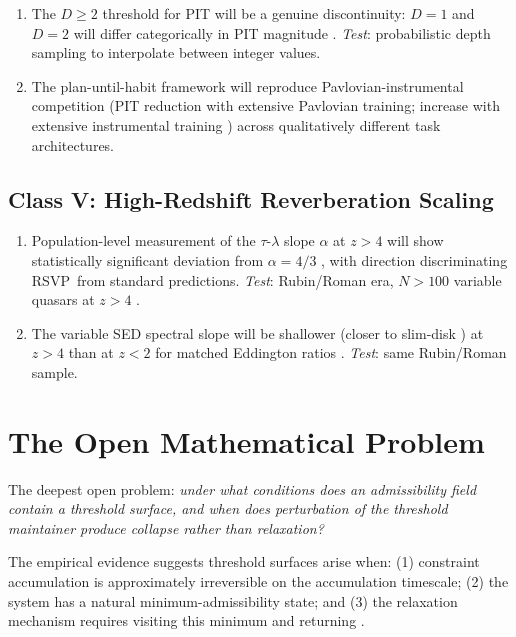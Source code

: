 \documentclass[12pt, a4paper, twoside]{book}
\theoremstyle{definition}
\theoremstyle{remark}
\newcommand{\RSVP}{\textsf{RSVP}}
\begin{document}
\begin{enumerate}[label=\textbf{P\arabic*.}, start=9]
  \item The $D \geq 2$ threshold for PIT will be a genuine discontinuity: $D = 1$ and $D = 2$ will differ categorically in PIT magnitude \citep{okitsu2026}. \textit{Test}: probabilistic depth sampling to interpolate between integer values.

  \item The plan-until-habit framework will reproduce Pavlovian-instrumental competition (PIT reduction with extensive Pavlovian training; increase with extensive instrumental training \citep{okitsu2026}) across qualitatively different task architectures.
\end{enumerate}

\subsection{Class V: High-Redshift Reverberation Scaling}

\begin{enumerate}[label=\textbf{P\arabic*.}, start=11]
  \item Population-level measurement of the $\tau$-$\lambda$ slope $\alpha$ at $z > 4$ will show statistically significant deviation from $\alpha = 4/3$ \citep{shakura1973}, with direction discriminating \RSVP\ from standard predictions. \textit{Test}: Rubin/Roman era, $N > 100$ variable quasars at $z > 4$ \citep{fanetal2023}.

  \item The variable SED spectral slope will be shallower (closer to slim-disk \citep{abramowicz1988}) at $z > 4$ than at $z < 2$ for matched Eddington ratios \citep{leung2026}. \textit{Test}: same Rubin/Roman sample.
\end{enumerate}

\section{The Open Mathematical Problem}

The deepest open problem: \emph{under what conditions does an admissibility field contain a threshold surface, and when does perturbation of the threshold maintainer produce collapse rather than relaxation?}

The empirical evidence suggests threshold surfaces arise when: (1) constraint accumulation is approximately irreversible on the accumulation timescale; (2) the system has a natural minimum-admissibility state; and (3) the relaxation mechanism requires visiting this minimum and returning \citep{tononi2014, driessen2026, funk2017}.
\end{document}
